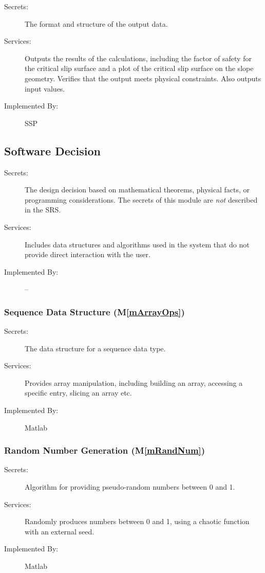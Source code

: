 \documentclass[12pt, titlepage]{article}
\newcommand{\progname}{SSP}
\newcommand{\mref}[1]{M\ref{#1}}
\begin{document}
\begin{description}
	\item[Secrets:] The format and structure of the output data.
	\item[Services:] Outputs the results of the calculations, including
	the factor of safety for the critical slip surface and a plot of the 
	critical
	slip surface on the slope geometry. Verifies that the output meets physical 
	constraints. Also outputs input values.
	\item[Implemented By:] \progname
\end{description} 


\subsection{Software Decision}

\begin{description}
\item[Secrets:] The design decision based on mathematical theorems,
  physical facts, or programming considerations. The secrets of this
  module are \emph{not} described in the SRS.
\item[Services:] Includes data structures and algorithms used in the
  system that do not provide direct interaction with the user.
\item[Implemented By:] --
\end{description}


\subsubsection{Sequence Data Structure (\mref{mArrayOps})}

\begin{description}
\item[Secrets:] The data structure for a sequence data type.
\item[Services:] Provides array manipulation, including building an
  array, accessing a specific entry, slicing an array etc.
\item[Implemented By:] Matlab
\end{description}


\subsubsection{Random Number Generation (\mref{mRandNum})}

\begin{description}
\item[Secrets:] Algorithm for providing pseudo-random numbers between 0 and 1.
\item[Services:] Randomly produces numbers between 0 and 1, using a
  chaotic function with an external seed.
\item[Implemented By:] Matlab
\end{description}
\end{document}

